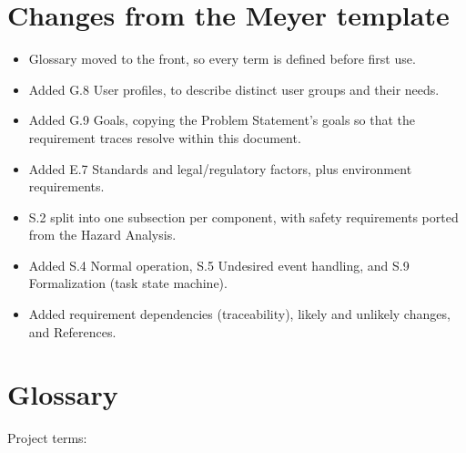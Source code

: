 \documentclass{scrreprt}
\theoremstyle{definition}
\begin{document}
\dominitoc%
\tableofcontents
\listoftables
\listoffigures
\adjustmtc

\chapter*{Changes from the Meyer template}

\begin{itemize}
    \item Glossary moved to the front, so every term is defined before first use.
    \item Added G.8 User profiles, to describe distinct user groups and their needs.
    \item Added G.9 Goals, copying the Problem Statement's goals so that the requirement traces resolve within this document.
    \item Added E.7 Standards and legal/regulatory factors, plus environment requirements.
    \item S.2 split into one subsection per component, with safety requirements ported from the Hazard Analysis.
    \item Added S.4 Normal operation, S.5 Undesired event handling, and S.9 Formalization (task state machine).
    \item Added requirement dependencies (traceability), likely and unlikely changes, and References.
\end{itemize}

\chapter*{Glossary}

Project terms:
\end{document}
